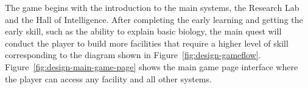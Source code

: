 \documentclass[12pt,oneside,openright,a4paper]{cpe-english-project}
\begin{document}
\begin{itemize}
\begin{minipage}[c]{\textwidth}\centering
{}
\label{fig:design-gameflow}
\end{minipage}

The game begins with the introduction to the main systems, the Research Lab and the Hall of Intelligence. After completing the early learning and getting the early skill, such as the ability to explain basic biology, the main quest will conduct the player to build more facilities that require a higher level of skill corresponding to the diagram shown in Figure~\ref{fig:design-gameflow}. Figure~\ref{fig:design-main-game-page} shows the main game page interface where the player can access any facility and all other systems.

\begin{minipage}[c]{\textwidth}\centering
{}
\label{fig:design-main-game-page}
\end{minipage}


\end{itemize}
\end{document}
